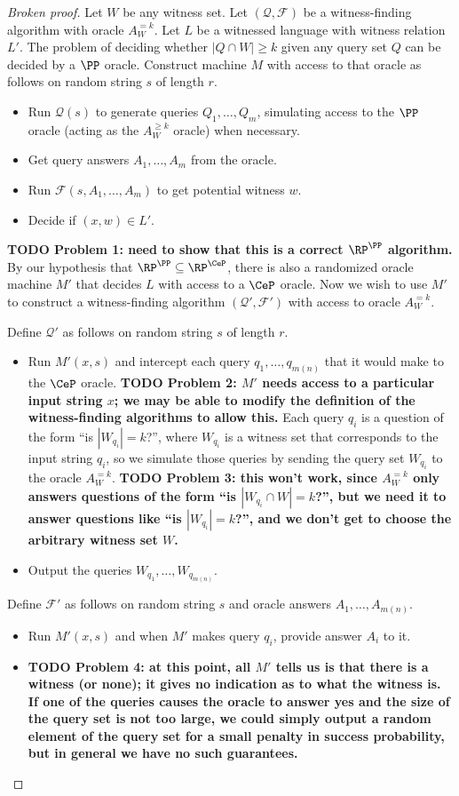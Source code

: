 \documentclass{article}
\newcommand{\todo}[1]{\textbf{TODO #1}}
\newcommand{\mc}{\mathcal}
\begin{document}
\begin{proof}[Broken proof]
  Let $W$ be any witness set.
  Let $(\mc{Q}, \mc{F})$ be a witness-finding algorithm with oracle $A^{= k}_W$.
  Let $L$ be a witnessed language with witness relation $L'$.
  The problem of deciding whether $|Q \cap W| \geq k$ given any query set $Q$ can be decided by a $\PP$ oracle.
  Construct machine $M$ with access to that oracle as follows on random string $s$ of length $r$.
  \begin{itemize}
  \item Run $\mc{Q}(s)$ to generate queries $Q_1, \dotsc, Q_m$, simulating access to the $\PP$ oracle (acting as the $A^{\geq k}_W$ oracle) when necessary.
  \item Get query answers $A_1, \dotsc, A_m$ from the oracle.
  \item Run $\mc{F}(s, A_1, \dotsc, A_m)$ to get potential witness $w$.
  \item Decide if $(x, w) \in L'$.
  \end{itemize}
  \todo{Problem 1: need to show that this is a correct $\RP^\PP$ algorithm.}
  By our hypothesis that $\RP^\PP \subseteq \RP^{\CeP}$, there is also a randomized oracle machine $M'$ that decides $L$ with access to a $\CeP$ oracle.
  Now we wish to use $M'$ to construct a witness-finding algorithm $(\mc{Q}', \mc{F}')$ with access to oracle $A^{= k}_W$.

  Define $\mc{Q}'$ as follows on random string $s$ of length $r$.
  \begin{itemize}
  \item Run $M'(x, s)$ and intercept each query $q_1, \dotsc, q_{m(n)}$ that it would make to the $\CeP$ oracle.
    \todo{Problem 2: $M'$ needs access to a particular input string $x$; we may be able to modify the definition of the witness-finding algorithms to allow this.}
    Each query $q_i$ is a question of the form ``is $|W_{q_i}| = k$?'', where $W_{q_i}$ is a witness set that corresponds to the input string $q_i$, so we simulate those queries by sending the query set $W_{q_i}$ to the oracle $A^{= k}_W$.
    \todo{Problem 3: this won't work, since $A^{= k}_W$ only answers questions of the form ``is $|W_{q_i} \cap W| = k$?'', but we need it to answer questions like ``is $|W_{q_i}| = k$?'', and we don't get to choose the arbitrary witness set $W$.}
  \item Output the queries $W_{q_1}, \dotsc, W_{q_{m(n)}}$.
  \end{itemize}
  Define $\mc{F}'$ as follows on random string $s$ and oracle answers $A_1, \dotsc, A_{m(n)}$.
  \begin{itemize}
  \item Run $M'(x, s)$ and when $M'$ makes query $q_i$, provide answer $A_i$ to it.
  \item \todo{Problem 4: at this point, all $M'$ tells us is that there is a witness (or none); it gives no indication as to what the witness is.
    If one of the queries causes the oracle to answer yes and the size of the query set is not too large, we could simply output a random element of the query set for a small penalty in success probability, but in general we have no such guarantees.}
  \end{itemize}
\end{proof}
\end{document}
